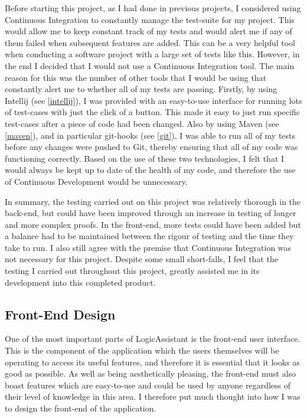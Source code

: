Before starting this project, as I had done in previous projects, I considered using Continuous Integration to constantly manage the test-suite for my project. This would allow me to keep constant track of my tests and would alert me if any of them failed when subsequent features are added. This can be a very helpful tool when conducting a software project with a large set of tests like this. However, in the end I decided that I would not use a Continuous Integration tool. The main reason for this was the number of other tools that I would be using that constantly alert me to whether all of my tests are passing. Firstly, by using Intellij (see \ref{intellij}), I was provided with an easy-to-use interface for running lots of test-cases with just the click of a button. This made it easy to just run specific test-cases after a piece of code had been changed. Also by using Maven (see \ref{maven}), and in particular git-hooks (see \ref{git}), I was able to run all of my tests before any changes were pushed to Git, thereby ensuring that all of my code was functioning correctly. Based on the use of these two technologies, I felt that I would always be kept up to date of the health of my code, and therefore the use of Continuous Development would be unnecessary.

In summary, the testing carried out on this project was relatively thorough in the back-end, but could have been improved through an increase in testing of longer and more complex proofs. In the front-end, more tests could have been added but a balance had to be maintained between the rigour of testing and the time they take to run. I also still agree with the premise that Continuous Integration was not necessary for this project. Despite some small short-falls, I feel that the testing I carried out throughout this project, greatly assisted me in its development into this completed product.

\subsection{Front-End Design}

One of the most important parts of LogicAssistant is the front-end user interface. This is the component of the application which the users themselves will be operating to access its useful features, and therefore it is essential that it looks as good as possible. As well as being aesthetically pleasing, the front-end must also boast features which are easy-to-use and could be used by anyone regardless of their level of knowledge in this area. I therefore put much thought into how I was to design the front-end of the application.

